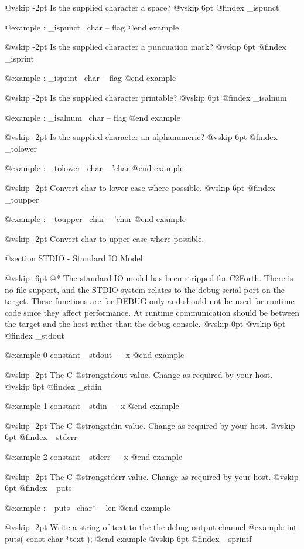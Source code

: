 @vskip -2pt
Is the supplied character a space?
@vskip 6pt
@findex _ispunct

@example
: _ispunct      \ char -- flag @end example

@vskip -2pt
Is the supplied character a puncuation mark?
@vskip 6pt
@findex _isprint

@example
: _isprint      \ char -- flag @end example

@vskip -2pt
Is the supplied character printable?
@vskip 6pt
@findex _isalnum

@example
: _isalnum      \ char -- flag @end example

@vskip -2pt
Is the supplied character an alphanumeric?
@vskip 6pt
@findex _tolower

@example
: _tolower      \ char -- 'char @end example

@vskip -2pt
Convert char to lower case where possible.
@vskip 6pt
@findex _toupper

@example
: _toupper      \ char -- 'char @end example

@vskip -2pt
Convert char to upper case where possible.

@section STDIO - Standard IO Model


@vskip -6pt
@*
The standard IO model has been stripped for C2Forth. There is no
file support, and the STDIO system relates to the debug serial
port on the target. These functions are for DEBUG only and should
not be used for runtime code since they affect performance. At
runtime communication should be between the target and the host
rather than the debug-console.
@vskip 0pt
@vskip 6pt
@findex _stdout

@example
0 constant _stdout      \ -- x @end example

@vskip -2pt
The C @strong{stdout} value. Change as required by your host.
@vskip 6pt
@findex _stdin

@example
1 constant _stdin       \ -- x @end example

@vskip -2pt
The C @strong{stdin} value. Change as required by your host.
@vskip 6pt
@findex _stderr

@example
2 constant _stderr      \ -- x @end example

@vskip -2pt
The C @strong{stderr} value. Change as required by your host.
@vskip 6pt
@findex _puts

@example
: _puts         \ char* -- len @end example

@vskip -2pt
Write a string of text to the the debug output channel
@example
  int puts( const char *text ); @end example
@vskip 6pt
@findex _sprintf

